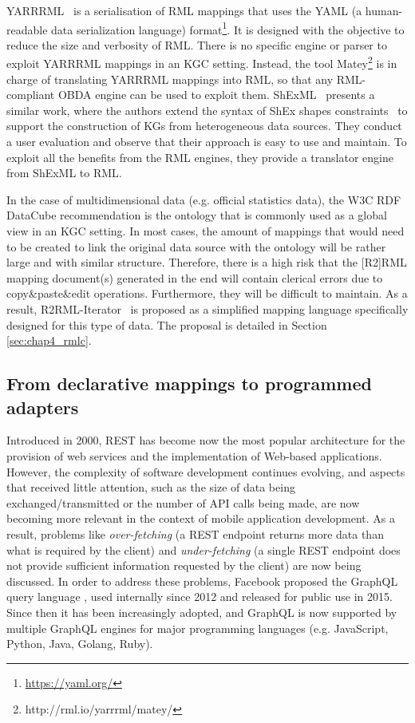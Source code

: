 YARRRML~\citep{Heyvaert2018Declarative} is a serialisation of RML mappings that uses the YAML (a human-readable data serialization language) format\footnote{\url{https://yaml.org/}}. It is designed with the objective to reduce the size and verbosity of RML. There is no specific engine or parser to exploit YARRRML mappings in an KGC setting. Instead, the tool Matey\footnote{http://rml.io/yarrrml/matey/} is in charge of translating YARRRML mappings into RML, so that any RML-compliant OBDA engine can be used to exploit them. ShExML~\citep{garcia2020shexml} presents a similar work, where the authors extend the syntax of ShEx shapes constraints~\citep{prud2014shape} to support the construction of KGs from heterogeneous data sources. They conduct a user evaluation and observe that their approach is easy to use and maintain. To exploit all the benefits from the RML engines, they provide a translator engine from ShExML to RML.

In the case of multidimensional data (e.g. official statistics data), the W3C RDF DataCube recommendation is the ontology that is commonly used as a global view in an KGC setting. In most cases, the amount of mappings that would need to be created to link the original data source with the ontology will be rather large and with similar structure. Therefore, there is a high risk that the [R2]RML mapping document(s) generated in the end will contain clerical errors due to copy\&paste\&edit operations. Furthermore, they will be difficult to maintain. As a result, R2RML-Iterator~\citep{chaves2018virtual} is proposed as a simplified mapping language specifically designed for this type of data. The proposal is detailed in Section \ref{sec:chap4_rmlc}.


\subsection{From declarative mappings to programmed adapters}
Introduced in 2000, REST \citep{fielding2000architectural} has become now the most popular architecture for the provision of web services and the implementation of Web-based applications. However, the complexity of software development continues evolving, and aspects that received little attention, such as the size of data being exchanged/transmitted or the number of API calls being made, are now becoming more relevant in the context of mobile application development. As a result, problems like \textit{over-fetching} (a REST endpoint returns more data than what is required by the client) and \textit{under-fetching} (a single REST endpoint does not provide sufficient information requested by the client) are now being discussed. In order to address these problems, Facebook proposed the GraphQL query language \citep{graphql}, used internally since 2012 and released for public use in 2015. Since then it has been increasingly adopted, and GraphQL is now supported by multiple GraphQL engines for major programming languages (e.g. JavaScript, Python, Java, Golang, Ruby).

